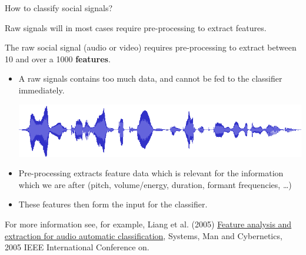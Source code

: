 \documentclass[compress]{beamer}
\begin{document}
\begin{frame}{How to classify social signals?}

    Raw signals will in most cases require pre-processing to extract
features.

The raw social signal (audio or video) requires pre-processing to
extract between 10 and over a 1000 \textbf{features}.

\begin{itemize}

    \item A raw signals contains too much data, and cannot be fed to the
      classifier immediately.

        \begin{center}
            \includegraphics[width=0.5\linewidth]{rawaudio}
        \end{center}

    \item Pre-processing extracts feature data which is relevant for the
  information which we are after (pitch, volume/energy, duration,
  formant frequencies, \ldots{})
    \item These features then form the input for the classifier.
\end{itemize}

    {\footnotesize
For more information see, for example, Liang et al. (2005)
\href{http://ieeexplore.ieee.org/xpls/icp.jsp?arnumber=1571239}{Feature
analysis and extraction for audio automatic classification}, Systems,
Man and Cybernetics, 2005 IEEE International Conference on.
    }


\end{frame}
\end{document}
